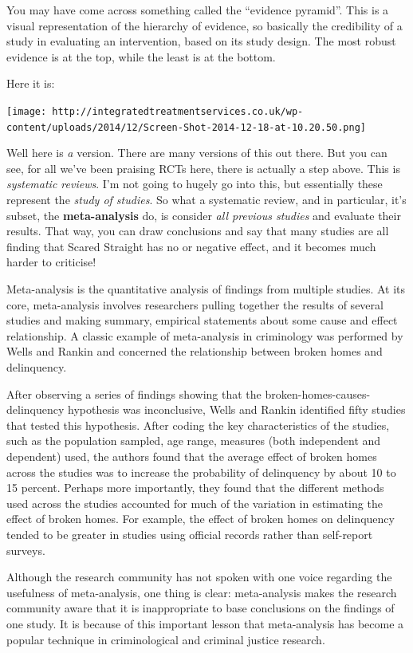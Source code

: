 \documentclass[]{book}
\theoremstyle{definition}
\theoremstyle{definition}
\theoremstyle{definition}
\theoremstyle{remark}
\begin{document}
You may have come across something called the ``evidence pyramid''. This
is a visual representation of the hierarchy of evidence, so basically
the credibility of a study in evaluating an intervention, based on its
study design. The most robust evidence is at the top, while the least is
at the bottom.

Here it is:

\texttt{[image: http://integratedtreatmentservices.co.uk/wp-content/uploads/2014/12/Screen-Shot-2014-12-18-at-10.20.50.png]}

Well here is \emph{a} version. There are many versions of this out
there. But you can see, for all we've been praising RCTs here, there is
actually a step above. This is \emph{systematic reviews}. I'm not going
to hugely go into this, but essentially these represent the \emph{study
of studies}. So what a systematic review, and in particular, it's
subset, the \textbf{meta-analysis} do, is consider \emph{all previous
studies} and evaluate their results. That way, you can draw conclusions
and say that many studies are all finding that Scared Straight has no or
negative effect, and it becomes much harder to criticise!

Meta-analysis is the quantitative analysis of findings from multiple
studies. At its core, meta-analysis involves researchers pulling
together the results of several studies and making summary, empirical
statements about some cause and effect relationship. A classic example
of meta-analysis in criminology was performed by Wells and Rankin and
concerned the relationship between broken homes and delinquency.

After observing a series of findings showing that the
broken-homes-causes-delinquency hypothesis was inconclusive, Wells and
Rankin identified fifty studies that tested this hypothesis. After
coding the key characteristics of the studies, such as the population
sampled, age range, measures (both independent and dependent) used, the
authors found that the average effect of broken homes across the studies
was to increase the probability of delinquency by about 10 to 15
percent. Perhaps more importantly, they found that the different methods
used across the studies accounted for much of the variation in
estimating the effect of broken homes. For example, the effect of broken
homes on delinquency tended to be greater in studies using official
records rather than self-report surveys.

Although the research community has not spoken with one voice regarding
the usefulness of meta-analysis, one thing is clear: meta-analysis makes
the research community aware that it is inappropriate to base
conclusions on the findings of one study. It is because of this
important lesson that meta-analysis has become a popular technique in
criminological and criminal justice research.
\end{document}
